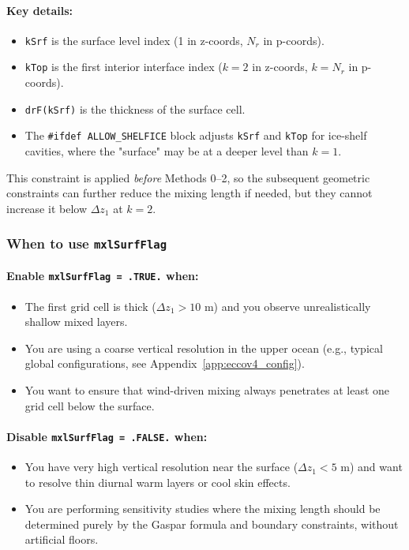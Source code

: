 \documentclass[12pt,letterpaper]{article}
\begin{document}
\paragraph{Key details:}
\begin{itemize}
\item \verb|kSrf| is the surface level index (1 in z-coords, $N_r$ in p-coords).
\item \verb|kTop| is the first interior interface index ($k=2$ in z-coords, $k=N_r$ in p-coords).
\item \verb|drF(kSrf)| is the thickness of the surface cell.
\item The \verb|#ifdef ALLOW_SHELFICE| block adjusts \verb|kSrf| and \verb|kTop| for ice-shelf cavities, where the "surface" may be at a deeper level than $k=1$.
\end{itemize}

This constraint is applied \emph{before} Methods 0--2, so the subsequent geometric constraints can further reduce the mixing length if needed, but they cannot increase it below $\Delta z_1$ at $k=2$.

\subsubsection{When to use \texttt{mxlSurfFlag}}

\paragraph{Enable \texttt{mxlSurfFlag = .TRUE.} when:}
\begin{itemize}
\item The first grid cell is thick ($\Delta z_1 > 10$ m) and you observe unrealistically shallow mixed layers.
\item You are using a coarse vertical resolution in the upper ocean (e.g., typical global configurations, see Appendix~\ref{app:eccov4_config}).
\item You want to ensure that wind-driven mixing always penetrates at least one grid cell below the surface.
\end{itemize}

\paragraph{Disable \texttt{mxlSurfFlag = .FALSE.} when:}
\begin{itemize}
\item You have very high vertical resolution near the surface ($\Delta z_1 < 5$ m) and want to resolve thin diurnal warm layers or cool skin effects.
\item You are performing sensitivity studies where the mixing length should be determined purely by the Gaspar formula and boundary constraints, without artificial floors.
\end{itemize}
\end{document}
